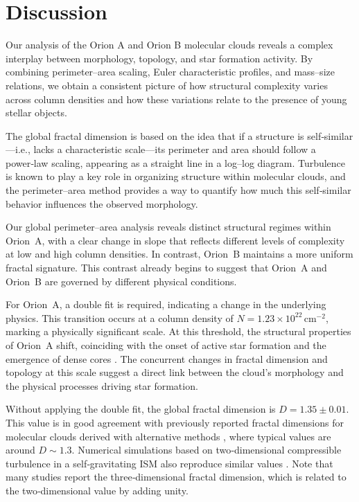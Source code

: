 \chapter{Discussion}

Our analysis of the Orion A and Orion B molecular clouds reveals a complex interplay between morphology, topology, and star formation activity. 
By combining perimeter–area scaling, Euler characteristic profiles, and mass–size relations, we obtain a consistent picture of how structural complexity varies across column densities and how these variations relate to the presence of young stellar objects.

The global fractal dimension is based on the idea that if a structure is self‑similar—i.e., lacks a characteristic scale—its perimeter and area should follow a power‑law scaling, appearing as a straight line in a log–log diagram.  
Turbulence is known to play a key role in organizing structure within molecular clouds, and the perimeter–area method provides a way to quantify how much this self‑similar behavior influences the observed morphology.

Our global perimeter–area analysis reveals distinct structural regimes within Orion~A, with a clear change in slope that reflects different levels of complexity at low and high column densities.  
In contrast, Orion~B maintains a more uniform fractal signature.  
This contrast already begins to suggest that Orion~A and Orion~B are governed by different physical conditions.

For Orion~A, a double fit is required, indicating a change in the underlying physics.  
This transition occurs at a column density of \(N = 1.23 \times 10^{22}\,\mathrm{cm}^{-2}\), marking a physically significant scale.  
At this threshold, the structural properties of Orion~A shift, coinciding with the onset of active star formation and the emergence of dense cores \cite{lada2010star}.  
The concurrent changes in fractal dimension and topology at this scale suggest a direct link between the cloud’s morphology and the physical processes driving star formation.

Without applying the double fit, the global fractal dimension is \(D = 1.35 \pm 0.01\).  
This value is in good agreement with previously reported fractal dimensions for molecular clouds derived with alternative methods \cite{elmegreen1996fractal}, where typical values are around \(D \sim 1.3\).  
Numerical simulations based on two‑dimensional compressible turbulence in a self‑gravitating ISM also reproduce similar values \cite{1994fns..book..515Y}.  
Note that many studies report the three‑dimensional fractal dimension, which is related to the two‑dimensional value by adding unity.

